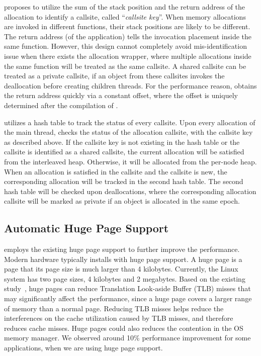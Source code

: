\NA{} proposes to utilize the sum of the stack position and the return address of the allocation to identify a callsite, called ``\textit{callsite key}''.  When memory allocations are invoked in different functions, their stack positions are likely to be different. The return address (of the application) tells the invocation placement inside the same function. However, this design cannot completely avoid mis-identification issue when there exists the allocation wrapper, where multiple allocations inside the same function will be treated as the same callsite. A shared callsite can be treated as a private callsite, if an object from  these callsites invokes the deallocation before creating children threads. For the performance reason, \NA{} obtains the return address quickly via a constant offset, where the offset is uniquely determined after the compilation of \NA{}. 

\NA{} utilizes a hash table to track the status of every callsite. Upon every allocation of the main thread, \NA{} checks the status of the allocation callsite, with the callsite key as described above. If the callsite key is not existing in the hash table or the callsite is identified as a shared callsite, the current allocation will be satisfied from the interleaved heap. Otherwise, it will be allocated from the per-node heap. When an allocation is satisfied in the callsite and the callsite is new, the corresponding allocation will be tracked in the second hash table. The second hash table will be checked upon deallocations, where the corresponding allocation callsite will be marked as private if an object is allocated in the same epoch. 

\subsection{Automatic Huge Page Support} 
\label{sec:hugepage}

\NA{} employs the existing huge page support to further improve the performance. Modern hardware typically installs with huge page support. A huge page is a page that its page size is much larger than 4 kilobytes. Currently, the Linux system has two page sizes, 4 kilobytes and 2 megabytes. Based on the existing study~\cite{hugepages}, huge pages can reduce Translation Look-aside Buffer (TLB) misses that may significantly affect the performance, since a huge page covers a larger range of memory than a normal page. Reducing TLB misses helps reduce the interferences on the cache utilization caused by TLB misses, and therefore reduces cache misses. Huge pages could also reduces the contention in the OS memory manager. We observed around 10\% performance improvement for some applications, when we are using huge page support. 

